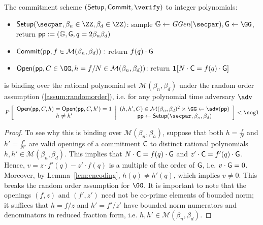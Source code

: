 \begin{lemma}
	The commitment scheme $(\setup,\commit, \verify)$ to integer polynomials: 
	\begin{itemize} 
	\item $\setup(\secpar,\beta_n\in \ZZ,\beta_d \in \ZZ)$: sample $\mathbb{G} \gets \ggen(\secpar) ,\Generator \gets \GG$, return $\crs := (\mathbb{G}, \gr{G}, q =2 \beta_n\beta_d)$
	\item $\textsf{{Commit}}(\textsf{pp},f\in \mathcal{M}(\beta_n,\beta_d)):$ return $f(q) \cdot \gr{G} $
	\item $\open(\crs,C\in \GG,h = f/N  \in \mathcal{M}(\beta_n,\beta_d) )$: return $\predicate{N\cdot\Commitment = f(q)\cdot \Generator} $
	\end{itemize} 
	is binding over the rational polynomial set $\mathcal{M}(\beta_n, \beta_d)$ under the random order assumption (\cref{assum:randomorder}), i.e. for any polynomial time adversary $\adv$ $$P\left[\begin{array}{c} 
	\open(\crs,C,h)=\open(\crs,C,h')=1\\
	h\neq h' 
\end{array}
 \middle|\begin{array}{c}
(h,h',C) \in \mathcal{M}(\beta_n,\beta_d)^2 \times \GG  \gets \adv(\crs)\\	
\crs \gets \setup(\secpar,\beta_n,\beta_d)
\end{array}
	 \right]<\negl$$
\end{lemma}
\begin{proof}
To see why this is binding over $\mathcal{M}(\beta_n, \beta_h)$, suppose that both $h=\frac{f}{N}$ and $h'=\frac{f'}{N'}$ are valid openings of a commitment $\gr{C}$ to distinct rational polynomials $h, h' \in \mathcal{M}(\beta_n, \beta_d)$. This implies that $N\cdot \gr{C} = f(q) \cdot \gr{G}$ and $z' \cdot \gr{C} = f'(q) \cdot \gr{G}$. Hence, $v =  z \cdot f'(q) - z' \cdot f(q)$ is a multiple of the order of $\gr{G}$, i.e. $v \cdot \gr{G} = 0$. Moreover, by Lemma~\ref{lem:encoding}, $h(q) \neq h'(q)$, which implies $v \neq 0$. This breaks the random order assumption for $\GG$. It is important to note that the openings $(f, z)$ and $(f', z')$ need not be co-prime elements of bounded norm; it suffices that $h = f/z$ and $h' = f'/z'$ have bounded norm numerators and denominators in reduced fraction form, i.e. $h, h' \in \mathcal{M}(\beta_n, \beta_d)$. 
\end{proof}



